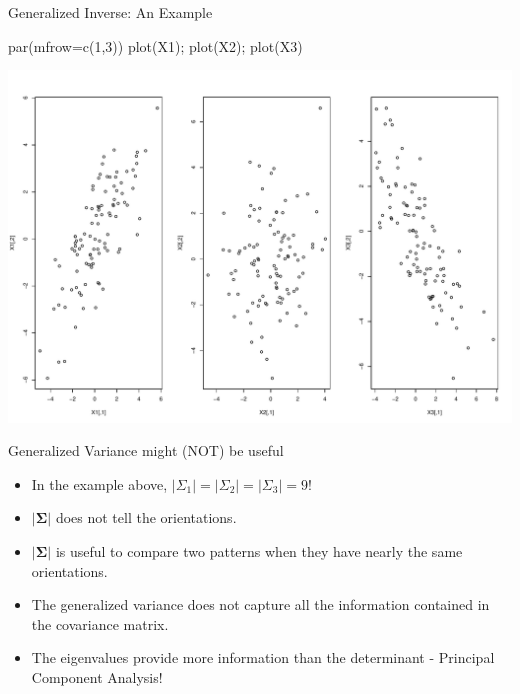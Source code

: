 \documentclass[
  ignorenonframetext,
]{beamer}
\newenvironment{Shaded}{\begin{snugshade}}{\end{snugshade}}
\newcommand{\AttributeTok}[1]{\textcolor[rgb]{0.77,0.63,0.00}{#1}}
\newcommand{\DecValTok}[1]{\textcolor[rgb]{0.00,0.00,0.81}{#1}}
\newcommand{\FunctionTok}[1]{\textcolor[rgb]{0.00,0.00,0.00}{#1}}
\newcommand{\NormalTok}[1]{#1}
\providecommand{\tightlist}{%
  \setlength{\itemsep}{0pt}\setlength{\parskip}{0pt}}
\begin{document}
\begin{frame}[fragile]{Generalized Inverse: An Example}
\protect\hypertarget{generalized-inverse-an-example-1}{}
\begin{Shaded}
\begin{Highlighting}[]
\FunctionTok{par}\NormalTok{(}\AttributeTok{mfrow=}\FunctionTok{c}\NormalTok{(}\DecValTok{1}\NormalTok{,}\DecValTok{3}\NormalTok{))}
\FunctionTok{plot}\NormalTok{(X1); }\FunctionTok{plot}\NormalTok{(X2); }\FunctionTok{plot}\NormalTok{(X3)}
\end{Highlighting}
\end{Shaded}

\includegraphics[width=1\linewidth,height=0.5\textheight]{Lecture04_ARandomSampleFromMultivariate_files/figure-beamer/unnamed-chunk-11-1}
\end{frame}

\begin{frame}{Generalized Variance might (NOT) be useful}
\protect\hypertarget{generalized-variance-might-not-be-useful}{}
\begin{itemize}
\tightlist
\item
  In the example above, \(|\Sigma_1|=|\Sigma_2|=|\Sigma_3|=9\)!
\item
  \(|\boldsymbol \Sigma|\) does not tell the orientations.
\item
  \(|\boldsymbol \Sigma|\) is useful to compare two patterns when they
  have nearly the same orientations.
\item
  The generalized variance does not capture all the information
  contained in the covariance matrix.
\item
  The eigenvalues provide more information than the determinant -
  Principal Component Analysis!
\end{itemize}
\end{frame}
\end{document}
